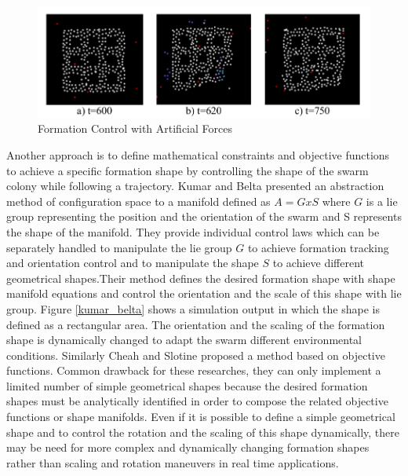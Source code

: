 \begin{figure}[H]
	\caption{Formation Control with Artificial Forces \cite{24}} \label{izgara_ref}
	\centering
	\includegraphics[scale = 0.4]{potential}
\end{figure}


Another approach is to define mathematical constraints and objective functions to achieve a specific formation shape by controlling the shape of the swarm colony while following a trajectory.  Kumar and Belta \cite{25} presented an abstraction method of configuration space to a manifold defined as $A  = G x S$ where $G$ is a lie group representing the position and the orientation of the swarm  and S represents the shape of the manifold.  They provide individual control laws which can be separately handled to manipulate the lie group $G$ to achieve formation tracking and orientation control and to manipulate the shape $S$ to achieve different geometrical shapes.Their method defines the desired formation shape with shape manifold equations and control the orientation and the scale of this shape with lie group. Figure \ref{kumar_belta}
shows a simulation output in which the shape is defined as a rectangular area. The orientation and the scaling of the formation shape is dynamically changed to adapt the swarm different environmental conditions. Similarly Cheah and Slotine \cite{8} proposed a method based on objective functions. Common drawback for these researches, they can only implement a limited number of simple geometrical shapes because the desired formation shapes must be analytically identified in order to compose the related objective functions or shape manifolds. Even if it is possible to define a simple geometrical shape and to control the rotation and the scaling of this shape dynamically, there may be need for more complex and dynamically changing formation shapes rather than scaling and rotation maneuvers in real time applications. 



